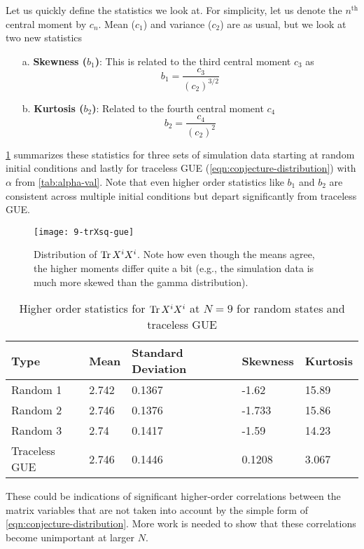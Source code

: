Let us quickly define the statistics we look at. For simplicity, let us denote the $n^\mathrm{th}$ central moment by $c_n$. Mean ($c_1$) and variance ($c_2$) are as usual, but we look at two new statistics
\begin{enumerate}
    \item[a.] {
        \textbf{Skewness ($b_1$)}: This is related to the third central moment $c_3$ as
        \begin{equation}
            b_1 = \frac{c_3}{(c_2)^{3/2}}
        \end{equation}
    }
    \item[b.] {
        \textbf{Kurtosis ($b_2$)}: Related to the fourth central moment $c_4$
        \begin{equation}
            b_2 = \frac{c_4}{(c_2)^{2}}
        \end{equation}
    }
\end{enumerate}

\cref{tab:deviations-from-random} summarizes these statistics for three sets of simulation data starting at random initial conditions and lastly for traceless GUE (\cref{eqn:conjecture-distribution}) with $\alpha$ from \cref{tab:alpha-val}. Note that even higher order statistics like $b_1$ and $b_2$ are consistent across multiple initial conditions but depart significantly from traceless GUE.

\begin{figure}[H]
    \centering
    \texttt{[image: 9-trXsq-gue]}
    \caption{Distribution of $\Tr X^i X^i$. Note how even though the means agree, the higher moments differ quite a bit (e.g., the simulation data is much more skewed than the gamma distribution).}
    \label{fig:9-trXsq-gue}
\end{figure}

\begin{table}[H]
\centering
    \begin{tabular}{ m{2.0cm} m{2.0cm} m{2.0cm} m{2.0cm} m{1.5cm}} 
    \toprule
    \toprule
    \textbf{Type} & \textbf{Mean} & \textbf{Standard Deviation} & \textbf{Skewness} & \textbf{Kurtosis} \\
    \midrule
    Random 1 & 2.742 & 0.1367 & -1.62  & 15.89 \\[1.3ex]
    Random 2 & 2.746 & 0.1376 & -1.733 & 15.86 \\[1.3ex]
    Random 3 & 2.74  & 0.1417 & -1.59  & 14.23 \\[1.3ex]
    Traceless GUE & 2.746 & 0.1446 & 0.1208 & 3.067 \\[1.3ex]
    \bottomrule
    \bottomrule
    \end{tabular}
\caption{Higher order statistics for $\Tr X^i X^i$ at $N = 9$ for random states and traceless GUE}
\label{tab:deviations-from-random}
\end{table}

These could be indications of significant higher-order correlations between the matrix variables that are not taken into account by the simple form of \cref{eqn:conjecture-distribution}. More work is needed to show that these correlations become unimportant at larger $N$.